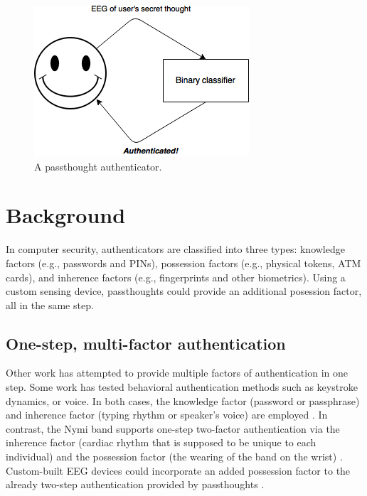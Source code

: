 \documentclass[sigconf]{acmart}
\begin{document}
\label{fig:earbud}
\begin{figure}[htbp]
\centering
\includegraphics[width=.9\linewidth]{./figures/passthoughts-diagram.png}
\caption{A passthought authenticator.}
\end{figure}

\section{Background}
\label{sec:orgc347ef7}

In computer security, authenticators are classified into three types: knowledge factors (e.g., passwords
and PINs), possession factors (e.g., physical tokens, ATM cards), and inherence
factors (e.g., fingerprints and other biometrics). 
Using a custom sensing device, passthoughts could provide an additional posession factor, all in the same step.

\subsection{One-step, multi-factor authentication}
\label{sec:org14f3bb1}

Other work has attempted to provide multiple factors of authentication in one step.
Some work has tested behavioral authentication methods such as keystroke dynamics, or voice. In both cases, the knowledge factor (password or passphrase) and
inherence factor (typing rhythm or speaker's voice) are employed \cite{Monrose1997}.
In contrast, the Nymi band supports one-step two-factor authentication via the inherence
factor (cardiac rhythm that is supposed to be unique to each individual) and the
possession factor (the wearing of the band on the wrist) \cite{Nymi}.
Custom-built EEG devices could incorporate an added possession factor 
to the already two-step authentication provided by passthoughts \cite{Curran2017}.
\end{document}
